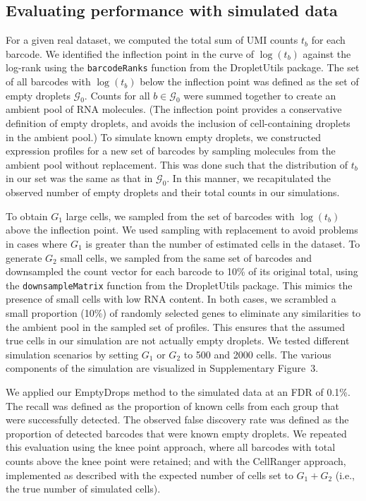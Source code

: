 \documentclass{bmcart}
\newcommand{\code}[1]{\texttt{#1}}
\newcommand{\suppfigsimdesign}{3}
\begin{document}
\subsection*{Evaluating performance with simulated data}
For a given real dataset, we computed the total sum of UMI counts $t_b$ for each barcode.
We identified the inflection point in the curve of $\log(t_b)$ against the log-rank using the \code{barcodeRanks} function from the \textsf{DropletUtils} package.
The set of all barcodes with $\log(t_b)$ below the inflection point was defined as the set of empty droplets $\mathcal{G}_0$.
Counts for all $b \in \mathcal{G}_0$ were summed together to create an ambient pool of RNA molecules.
(The inflection point provides a conservative definition of empty droplets, and avoids the inclusion of cell-containing droplets in the ambient pool.)
To simulate known empty droplets, we constructed expression profiles for a new set of barcodes by sampling molecules from the ambient pool without replacement.
This was done such that the distribution of $t_b$ in our set was the same as that in $\mathcal{G}_0$. 
In this manner, we recapitulated the observed number of empty droplets and their total counts in our simulations.

To obtain $G_1$ large cells, we sampled from the set of barcodes with $\log(t_b)$ above the inflection point.
We used sampling with replacement to avoid problems in cases where $G_1$ is greater than the number of estimated cells in the dataset.
To generate $G_2$ small cells, we sampled from the same set of barcodes and downsampled the count vector for each barcode to 10\% of its original total,
using the \code{downsampleMatrix} function from the \textsf{DropletUtils} package.
This mimics the presence of small cells with low RNA content. 
In both cases, we scrambled a small proportion (10\%) of randomly selected genes to eliminate any similarities to the ambient pool in the sampled set of profiles.
This ensures that the assumed true cells in our simulation are not actually empty droplets.
We tested different simulation scenarios by setting $G_1$ or $G_2$ to 500 and 2000 cells.
The various components of the simulation are visualized in Supplementary Figure~\suppfigsimdesign{}.

We applied our EmptyDrops method to the simulated data at an FDR of 0.1\%. 
The recall was defined as the proportion of known cells from each group that were successfully detected.
The observed false discovery rate was defined as the proportion of detected barcodes that were known empty droplets.
We repeated this evaluation using the knee point approach, where all barcodes with total counts above the knee point were retained;
and with the CellRanger approach, implemented as described \cite{zheng2017massively} with the expected number of cells set to $G_1+G_2$ (i.e., the true number of simulated cells).
\end{document}
